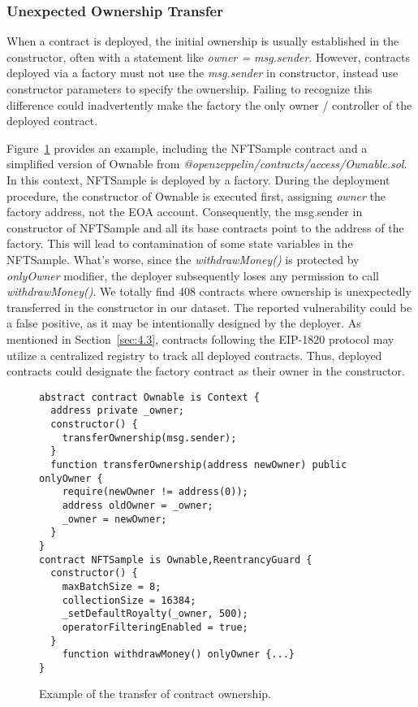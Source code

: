 \documentclass[acmsmall,screen]{acmart}
\begin{document}
	\subsubsection{Unexpected Ownership Transfer}\label{sec:security-senderconst} When a contract is deployed, the initial ownership is usually established in the constructor, often with a statement like \textit{owner = msg.sender}. However, contracts deployed via a factory must not use the \textit{msg.sender} in constructor, instead use constructor parameters to specify the ownership. Failing to recognize this difference could inadvertently make the factory the only owner / controller of the deployed contract.


	Figure~\ref{lst:senderinconst} provides an example, including the NFTSample contract and a simplified version of Ownable from \textit{@openzeppelin/contracts/access/Ownable.sol}. In this context, NFTSample is deployed by a factory. During the deployment procedure, the constructor of Ownable is executed first, assigning \textit{owner} the factory address, not the EOA account. Consequently, the msg.sender in constructor of NFTSample and all its base contracts point to the address of the factory. This will lead to contamination of some state variables in the NFTSample. What's worse, since the \textit{withdrawMoney()} is protected by \textit{onlyOwner} modifier, the deployer subsequently loses any permission to call \textit{withdrawMoney()}. We totally find 408 contracts where ownership is unexpectedly transferred in the constructor in our dataset\cite{fscdata}. The reported vulnerability could be a false positive, as it may be intentionally designed by the deployer. As mentioned in Section~\ref{sec:4.3}, contracts following the EIP-1820 protocol may utilize a centralized registry to track all deployed contracts. Thus, deployed contracts could designate the factory contract as their owner in the constructor.

	\begin{figure}[t]
		\begin{minipage}{\linewidth}
			\begin{lstlisting}
abstract contract Ownable is Context {
  address private _owner;
  constructor() {
    transferOwnership(msg.sender);
  }
  function transferOwnership(address newOwner) public onlyOwner {
    require(newOwner != address(0));
    address oldOwner = _owner;
    _owner = newOwner;
  }
}
contract NFTSample is Ownable,ReentrancyGuard {
  constructor() {
    maxBatchSize = 8;
    collectionSize = 16384;
    _setDefaultRoyalty(_owner, 500);
    operatorFilteringEnabled = true;
  }
    function withdrawMoney() onlyOwner {...}
}
			\end{lstlisting}
		\end{minipage}
		\caption{Example of the transfer of contract ownership.}
		\label{lst:senderinconst}
	\end{figure}
\end{document}

